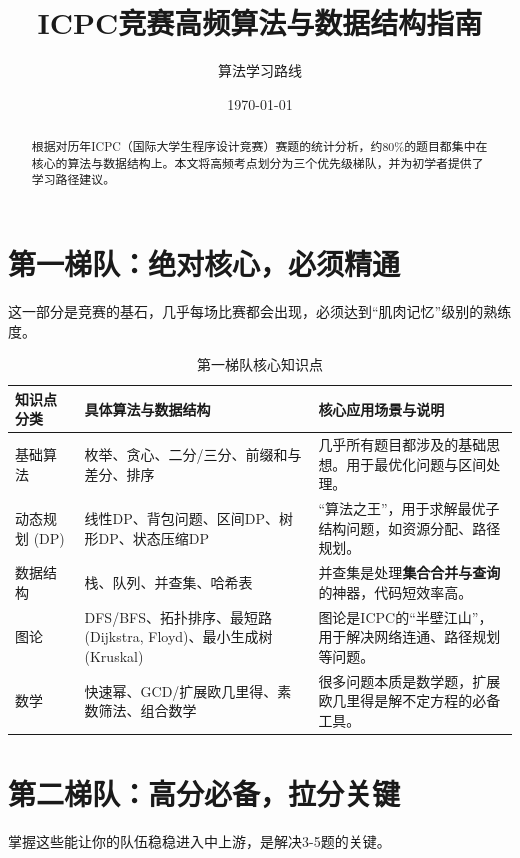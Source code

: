 \documentclass[12pt,a4paper]{article}
\title{\textbf{ICPC竞赛高频算法与数据结构指南}}
\author{算法学习路线}
\date{\today}
\begin{document}
	
	\maketitle
	
	\begin{abstract}
		根据对历年ICPC（国际大学生程序设计竞赛）赛题的统计分析，约80\%的题目都集中在核心的算法与数据结构上。本文将高频考点划分为三个优先级梯队，并为初学者提供了学习路径建议。
	\end{abstract}
	
	\section{第一梯队：绝对核心，必须精通}
	这一部分是竞赛的基石，几乎每场比赛都会出现，必须达到“肌肉记忆”级别的熟练度。
	
	\begin{table}[h!]
		\centering
		\caption{第一梯队核心知识点}
		\label{tab:tier1}
		\begin{tabularx}{\textwidth}{|X|X|X|}
			\hline
			\rowcolor{lightgray} \textbf{知识点分类} & \textbf{具体算法与数据结构} & \textbf{核心应用场景与说明} \\ \hline
			基础算法 & 枚举、贪心、二分/三分、前缀和与差分、排序 & 几乎所有题目都涉及的基础思想。用于最优化问题与区间处理。 \\ \hline
			动态规划 (DP) & 线性DP、背包问题、区间DP、树形DP、状态压缩DP & “算法之王”，用于求解最优子结构问题，如资源分配、路径规划。 \\ \hline
			数据结构 & 栈、队列、并查集、哈希表 & 并查集是处理\textbf{集合合并与查询}的神器，代码短效率高。 \\ \hline
			图论 & DFS/BFS、拓扑排序、最短路(Dijkstra, Floyd)、最小生成树(Kruskal) & 图论是ICPC的“半壁江山”，用于解决网络连通、路径规划等问题。 \\ \hline
			数学 & 快速幂、GCD/扩展欧几里得、素数筛法、组合数学 & 很多问题本质是数学题，扩展欧几里得是解不定方程的必备工具。 \\ \hline
		\end{tabularx}
	\end{table}
	
	\section{第二梯队：高分必备，拉分关键}
	掌握这些能让你的队伍稳稳进入中上游，是解决3-5题的关键。
	
\end{document}
